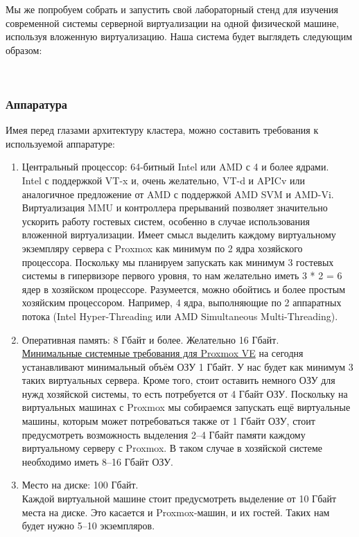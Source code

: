 \documentclass[14pt, a4paper]{article}
\begin{document}
Мы же попробуем собрать и запустить свой лабораторный стенд для изучения современной системы
серверной виртуализации на одной физической машине, используя вложенную виртуализацию. Наша
система будет выглядеть следующим образом:

\newpage

\begin{figure}[h]
    \centering
    \\ 
    \label{framework} 
\end{figure}

\subsubsection*{Аппаратура} 

Имея перед глазами архитектуру кластера, можно составить требования к используемой аппаратуре:
\begin{enumerate}
    \item Центральный процессор: 64-битный Intel или AMD с 4 и более ядрами.\\
    
    Intel с поддержкой VT-x и, очень желательно, VT-d и APICv или аналогичное предложение от
    AMD с поддержкой AMD SVM и AMD-Vi. Виртуализация MMU и контроллера прерываний
    позволяет значительно ускорить работу гостевых систем, особенно в случае использования
    вложенной виртуализации. Имеет смысл выделить каждому виртуальному экземпляру
    сервера с Proxmox как минимум по 2 ядра хозяйского процессора. Поскольку мы планируем
    запускать как минимум 3 гостевых системы в гипервизоре первого уровня, то нам желательно
    иметь 3 * 2 = 6 ядер в хозяйском процессоре. Разумеется, можно обойтись и более простым
    хозяйским процессором. Например, 4 ядра, выполняющие по 2 аппаратных потока (Intel
    Hyper-Threading или AMD Simultaneous Multi-Threading).
    \item Оперативная память: 8 Гбайт и более. Желательно 16 Гбайт.\\
    
    \href{https://pve.proxmox.com/wiki/System_Requirements}{Минимальные системные требования для Proxmox VE} на сегодня устанавливают
    минимальный объём ОЗУ 1 Гбайт. У нас будет как минимум 3 таких виртуальных сервера.
    Кроме того, стоит оставить немного ОЗУ для нужд хозяйской системы, то есть потребуется от
    4 Гбайт ОЗУ. Поскольку на виртуальных машинах с Proxmox мы собираемся запускать ещё
    виртуальные машины, которым может потребоваться также от 1 Гбайт ОЗУ, стоит
    предусмотреть возможность выделения 2–4 Гбайт памяти каждому виртуальному серверу с
    Proxmox. В таком случае в хозяйской системе необходимо иметь 8–16 Гбайт ОЗУ.
    \item Место на диске: 100 Гбайт.\\
    
    Каждой виртуальной машине стоит предусмотреть выделение от 10 Гбайт места на диске. Это
    касается и Proxmox-машин, и их гостей. Таких нам будет нужно 5–10 экземпляров.
\end{enumerate}
\end{document}
